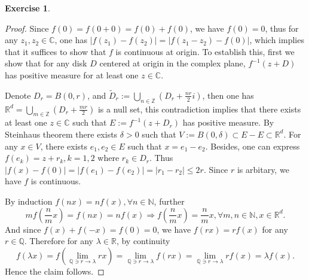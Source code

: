 \documentclass[a4paper]{article}
\newtheorem{ex}{Exercise}[subsection]
\begin{document}
\begin{ex}\end{ex}\begin{proof}
Since $f(0) = f(0 + 0) = f(0) + f(0)$, we have $f(0) = 0$, thus for any $z_1, z_2 \in \mathbb{C}$, one has 
$|f(z_1) - f(z_2)| = |f(z_1 - z_2) - f(0)|$, which implies that it suffices to show that $f$ is continuous at origin.
To establish this, first we show that for any disk $D$ centered at origin in the complex plane, $f^{-1}(z + D)$ has 
positive measure for at least one $z \in \mathbb{C}$.

Denote $D_r = B(0, r)$, and $\tilde{D}_r := \bigcup_{n \in \mathbb{Z}} (D_r + \frac{nr}{2}i)$, then one has $\mathbb{R}^d
= \bigcup_{m \in \mathbb{Z}} (D_r + \frac{mr}{2})$ is a null set, this contradiction implies that there exists at least
one $z \in \mathbb{C}$ such that $E := f^{-1}(z + D_r)$ has positive measure. By Steinhaus theorem there exists $\delta > 0$
such that $V := B(0, \delta) \subset E - E\subset \mathbb{R}^d$. For any $x \in V$, there exists $e_1, e_2 \in E$ 
such that $x = e_1 - e_2$. Besides, one can express $f(e_k) = z + r_k, k = 1, 2$ where $r_k \in D_r$. Thus 
$|f(x) - f(0)| = |f(e_1) - f(e_2)| = |r_1 - r_2| \leq 2r$. Since $r$ is arbitary, we have $f$ is continuous.

By induction $f(nx) = nf(x), \forall n \in \mathbb{N}$, further $$
mf(\frac{n}{m}x) = f(nx) = nf(x) \Rightarrow f(\frac{n}{m}x) = \frac{n}{m}x, \forall  m, n \in \mathbb{N}, x \in \mathbb{R}^d.
$$And since $f(x) + f(-x) = f(0) = 0$, we have $f(rx) = rf(x)$ for any $r \in \mathbb{Q}$. Therefore for any
$\lambda \in \mathbb{R}$, by continuity $$
f(\lambda x) = f(\lim_{\mathbb{Q}\ni r \to \lambda} rx) = \lim_{\mathbb{Q}\ni r \to \lambda}  f(rx) = 
\lim_{\mathbb{Q}\ni r \to \lambda} rf(x) = \lambda f(x).
$$Hence the claim follows.
\end{proof}
\end{document}
